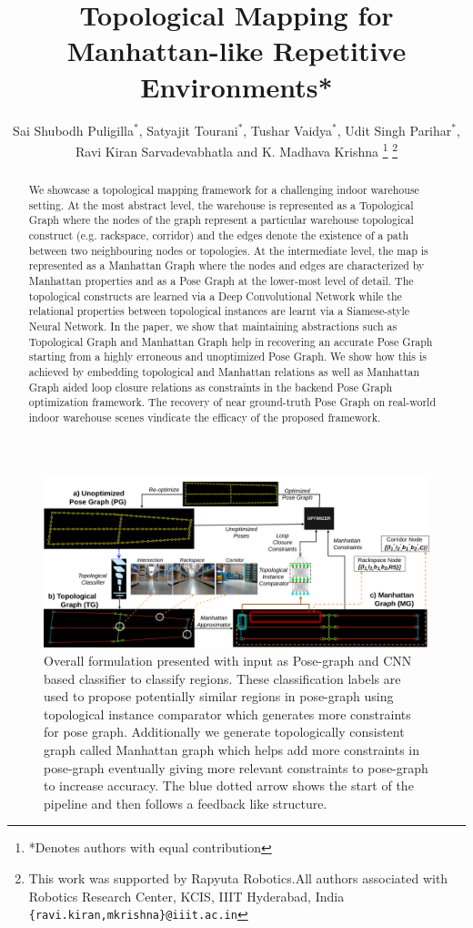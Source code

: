 \documentclass[letterpaper, 10 pt, conference]{ieeeconf}  %
\title{\LARGE \bf
	Topological Mapping for Manhattan-like Repetitive Environments*
}
\author{Sai Shubodh Puligilla$^{*}$, Satyajit Tourani$^{*}$, Tushar Vaidya$^{*}$, Udit Singh Parihar$^{*}$, \\ Ravi Kiran Sarvadevabhatla and K. Madhava Krishna%
	\thanks{*Denotes authors with equal contribution}%
	\thanks{This work was supported by Rapyuta Robotics.All authors associated with Robotics Research Center, KCIS, IIIT Hyderabad, India
		{\tt\small \{ravi.kiran,mkrishna\}@iiit.ac.in}}%
}
\begin{document}
	
	
	
	\maketitle
	\thispagestyle{empty}
	\pagestyle{empty}
	
	
	\begin{figure}[ht]
		\includegraphics[width=500px]{pic/pipeline_FINAL0434.png}
		\caption{Overall formulation presented with input as Pose-graph and CNN based classifier to classify regions. These classification labels are used to propose potentially similar regions in pose-graph using topological instance comparator which generates more constraints for pose graph. Additionally we generate topologically consistent graph called Manhattan graph which helps add more constraints in pose-graph eventually giving more relevant constraints to pose-graph to increase accuracy. The blue dotted arrow shows the start of the pipeline and then follows a feedback like structure.}
		\label{fig:fig1_pipeline}
	\end{figure}
	\begin{abstract}
		We showcase a topological mapping framework for a challenging indoor warehouse setting. At the most abstract level, the warehouse is represented as a Topological Graph where the nodes of the graph represent a particular warehouse topological construct (e.g. rackspace, corridor) and the edges denote the existence of a path between two neighbouring nodes or topologies. At the intermediate level, the map is represented as a Manhattan Graph where the nodes and edges are characterized by Manhattan properties and as a Pose Graph at the lower-most level of detail. The topological constructs are learned via a Deep Convolutional Network while the relational properties between topological instances are learnt via a Siamese-style Neural Network. In the paper, we show that maintaining abstractions such as Topological Graph and Manhattan Graph help in recovering an accurate Pose Graph starting from a highly erroneous and unoptimized Pose Graph. We show how this is achieved by embedding topological and Manhattan relations as well as Manhattan Graph aided loop closure relations as constraints in the backend Pose Graph optimization framework. The recovery of near ground-truth Pose Graph on real-world indoor warehouse scenes vindicate the efficacy of the proposed framework.
	\end{abstract}
	
\end{document}
